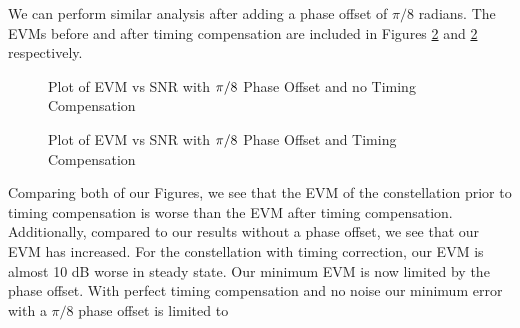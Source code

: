 \documentclass{article}
\begin{document}
	We can perform similar analysis after adding a phase offset of $\pi/8$ radians. The EVMs before and after timing compensation are included in Figures \ref{fig::evm_vs_snr_with_phase_offset} and \ref{fig::evm_vs_snr_with_phase_offset} respectively.

\begin{figure}[H]
	\centerline{}
	\caption{Plot of EVM vs SNR with $\protect\pi/8$ Phase Offset and no Timing Compensation}
	\label{fig::evm_vs_snr_with_phase_offset_no_comp}
\end{figure}

\begin{figure}[H]
	\centerline{}
	\caption{Plot of EVM vs SNR with $\protect\pi/8$ Phase Offset and Timing Compensation}
	\label{fig::evm_vs_snr_with_phase_offset}
\end{figure}

\noindent Comparing both of our Figures, we see that the EVM of the constellation prior to timing compensation is worse than the EVM after timing compensation. Additionally, compared to our results without a phase offset, we see that our EVM has increased. For the constellation with timing correction, our EVM is almost 10 dB worse in steady state. Our minimum EVM is now limited by the phase offset. With perfect timing compensation and no noise our minimum error with a $\pi/8$ phase offset is limited to
\end{document}
